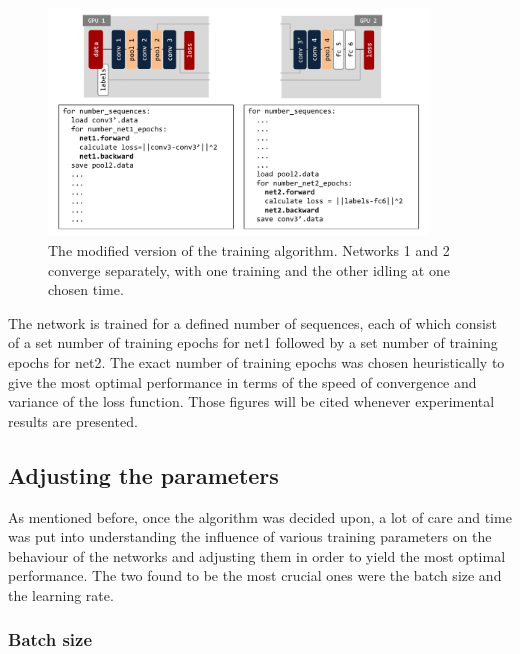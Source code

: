 \documentclass[a4paper, 12pt]{article}
\numberwithin{equation}{section}
\begin{document}
	\begin{figure}[!h]
		\centering
		\includegraphics[page=1,width=0.9\textwidth]{algocode_revisited.pdf}
		\caption{\label{fig:algorithm_revisited}{The modified version of the training algorithm. Networks 1 and 2 converge separately, with one training and the other idling at one chosen time.}}
	\end{figure}

	The network is trained for a defined number of sequences, each of which consist of a set number of training epochs for net1 followed by a set number of training epochs for net2. The exact number of training epochs was chosen heuristically to give the most optimal performance in terms of the speed of convergence and variance of the loss function. Those figures will be cited whenever experimental results are presented.
	
	\subsection{Adjusting the parameters}
	
	As mentioned before, once the algorithm was decided upon, a lot of care and time was put into understanding the influence of various training parameters on the behaviour of the networks and adjusting them in order to yield the most optimal performance. The two found to be the most crucial ones were the batch size and the learning rate.
	
	\subsubsection{Batch size}
	
\end{document}
